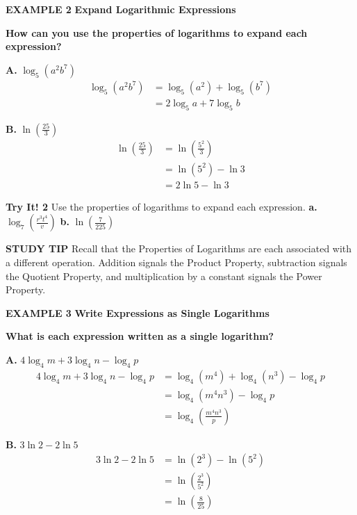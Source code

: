 \documentclass{article}
\newenvironment{example}[1]{\textbf{EXAMPLE #1}}{}
\newenvironment{tryit}[1]{\textbf{Try It! #1}}{}
\newcommand{\answer}[1]{}
\begin{document}
\begin{example}{2}
\textbf{Expand Logarithmic Expressions}

\textbf{How can you use the properties of logarithms to expand each expression?}

\textbf{A.} $\log_5(a^2b^7)$
\begin{align*}
\log_5(a^2b^7) &= \log_5(a^2) + \log_5(b^7) \\
&= 2\log_5 a + 7\log_5 b
\end{align*}

\textbf{B.} $\ln\left(\frac{25}{3}\right)$
\begin{align*}
\ln\left(\frac{25}{3}\right) &= \ln\left(\frac{5^2}{3}\right) \\
&= \ln(5^2) - \ln 3 \\
&= 2\ln 5 - \ln 3
\end{align*}
\end{example}

\begin{tryit}{2}
Use the properties of logarithms to expand each expression.
\textbf{a.} $\log_7\left(\frac{r^3 t^4}{v}\right)$ \quad
\textbf{b.} $\ln\left(\frac{7}{225}\right)$
\answer{a. $3\log_7 r + 4\log_7 t - \log_7 v$ \quad b. $\ln 7 - 2\ln 15$}
\end{tryit}

\vspace{1em}
\textbf{STUDY TIP}
Recall that the Properties of Logarithms are each associated with a different operation. Addition signals the Product Property, subtraction signals the Quotient Property, and multiplication by a constant signals the Power Property.

\begin{example}{3}
\textbf{Write Expressions as Single Logarithms}

\textbf{What is each expression written as a single logarithm?}

\textbf{A.} $4\log_4 m + 3\log_4 n - \log_4 p$
\begin{align*}
4\log_4 m + 3\log_4 n - \log_4 p &= \log_4(m^4) + \log_4(n^3) - \log_4 p \\
&= \log_4(m^4 n^3) - \log_4 p \\
&= \log_4\left(\frac{m^4 n^3}{p}\right)
\end{align*}

\textbf{B.} $3\ln 2 - 2\ln 5$
\begin{align*}
3\ln 2 - 2\ln 5 &= \ln(2^3) - \ln(5^2) \\
&= \ln\left(\frac{2^3}{5^2}\right) \\
&= \ln\left(\frac{8}{25}\right)
\end{align*}
\end{example}
\end{document}
